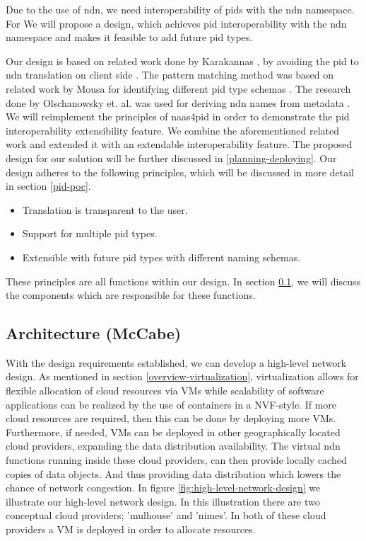 Due to the use of \gls{ndn}, we need interoperability of \glspl{pid} with the \gls{ndn} namespace. For 
We will propose a design, which achieves \gls{pid} interoperability with the \gls{ndn} namespace and makes it feasible to add future \gls{pid} types.



Our design is based on related work done by Karakannas \cite{icn-bd}, by avoiding the \gls{pid} to \gls{ndn} translation on client side \cite{icn-bd}. The pattern matching method was based on related work by Mousa for identifying different \gls{pid} type schemas \cite{ndn-app-aware}. The research done by Olschanowsky et. al. was used for deriving \gls{ndn} names from metadata \cite{ndn-man}.
We will reimplement the principles of \gls{naas4pid} in order to demonstrate the \gls{pid} interoperability extensibility feature.
We combine the aforementioned related work and extended it with an extendable interoperability feature. The proposed design for our solution will be further discussed in \ref{planning-deploying}.
Our design adheres to the following principles, which will be discussed in more detail in section \ref{pid-poc}.
 
\begin{itemize}
    \item{Translation is transparent to the user.}
    \item{Support for multiple \gls{pid} types.}
    \item{Extensible with future \gls{pid} types with different naming schemas.}
\end{itemize}

These principles are all functions within our design. In section \ref{planning-architecture}, we will discuss the components which are responsible for these functions.

\subsection{Architecture (McCabe)}
\label{planning-architecture}
With the design requirements established, we can develop a high-level network design. As mentioned in section \ref{overview-virtualization}, virtualization allows for flexible allocation of cloud resources via VMs while scalability of software applications can be realized by the use of containers in a NVF-style. If more cloud resources are required, then this can be done by deploying more VMs. Furthermore, if needed, VMs can be deployed in other geographically located cloud providers, expanding the data distribution availability. The virtual \gls{ndn} functions running inside these cloud providers, can then provide locally cached copies of data objects. And thus providing data distribution which lowers the chance of network congestion. In figure \ref{fig:high-level-network-design} we illustrate our high-level network design. In this illustration there are two conceptual cloud providers; 'mulhouse' and 'nimes'. In both of these cloud providers a VM is deployed in order to allocate resources.

